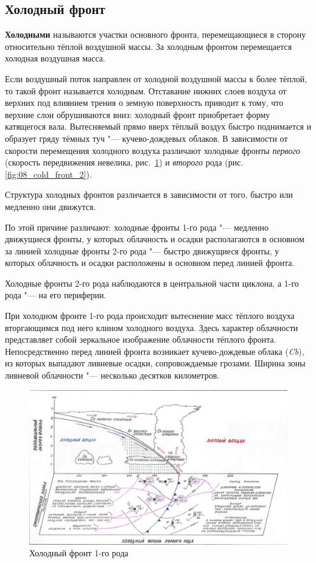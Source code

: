 \documentclass[a4paper, 12pt, twoside, draft, book, russian, fittopage, cyremdash, openright]{ncc}
\begin{document}
\subsection{Холодный фронт}
\label{sec:cold_front}

\textbf{Холодными} называются участки основного фронта, перемещающиеся в
сторону относительно тёплой воздушной массы. За холодным фронтом
перемещается холодная воздушная масса.

Если воздушный поток направлен от холодной воздушной массы к более
тёплой, то такой фронт называется холодным. Отставание нижних слоев
воздуха от верхних под влиянием трения о земную поверхность приводит к
тому, что верхние слои обрушиваются вниз: холодный фронт приобретает
форму катящегося вала. Вытесняемый прямо вверх тёплый воздух быстро
поднимается и образует гряду тёмных туч "--- кучево-дождевых
облаков. В зависимости от скорости перемещения холодного воздуха
различают холодные фронты \textit{первого} (скорость передвижения
невелика, рис.~\ref{fig:07_cold_front_1}) и \textit{второго} рода
(рис.\ref{fig:08_cold_front_2}).

Структура холодных фронтов различается в зависимости от того, быстро
или медленно они движутся.

По этой причине различают: холодные фронты 1-го
рода "--- медленно движущиеся фронты,
у которых облачность и осадки располагаются в основном за линией
холодные фронты 2-го рода "--- быстро
движущиеся фронты, у которых облачность и осадки расположены в
основном перед линией фронта.

Холодные фронты 2-го рода наблюдаются в центральной части
циклона, а 1-го рода "--- на его периферии.

При холодном фронте 1-го рода происходит вытеснение масс тёплого
воздуха вторгающимся под него клином холодного воздуха. Здесь характер
облачности представляет собой зеркальное изображение облачности
тёплого фронта. Непосредственно перед линией фронта возникает
кучево-дождевые облака (\textit{Cb}), из которых выпадают ливневые осадки,
сопровождаемые грозами. Ширина зоны ливневой облачности "--- несколько
десятков километров.

\begin{figure}[htb]
   \centering
   \includegraphics[scale=0.7]{07_cold_front_1.pdf}
   \caption{Холодный фронт 1-го рода}
   \label{fig:07_cold_front_1}
\end{figure}
\end{document}
